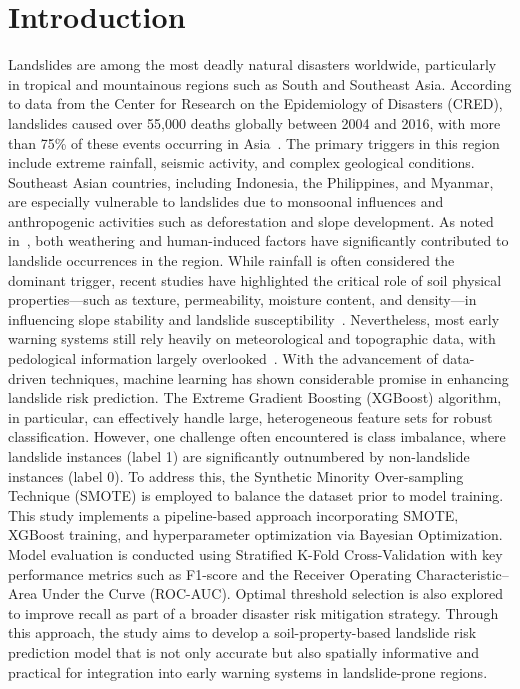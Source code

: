 \section{Introduction}

Landslides are among the most deadly natural disasters worldwide, particularly in tropical and mountainous regions such as South and Southeast Asia. According to data from the Center for Research on the Epidemiology of Disasters (CRED), landslides caused over 55,000 deaths globally between 2004 and 2016, with more than 75\% of these events occurring in Asia~\cite{intro01}. The primary triggers in this region include extreme rainfall, seismic activity, and complex geological conditions.
Southeast Asian countries, including Indonesia, the Philippines, and Myanmar, are especially vulnerable to landslides due to monsoonal influences and anthropogenic activities such as deforestation and slope development. As noted in~\cite{intro02}, both weathering and human-induced factors have significantly contributed to landslide occurrences in the region.
While rainfall is often considered the dominant trigger, recent studies have highlighted the critical role of soil physical properties—such as texture, permeability, moisture content, and density—in influencing slope stability and landslide susceptibility~\cite{intro03}. Nevertheless, most early warning systems still rely heavily on meteorological and topographic data, with pedological information largely overlooked~\cite{intro04}.
With the advancement of data-driven techniques, machine learning has shown considerable promise in enhancing landslide risk prediction. The Extreme Gradient Boosting (XGBoost) algorithm, in particular, can effectively handle large, heterogeneous feature sets for robust classification. However, one challenge often encountered is class imbalance, where landslide instances (label 1) are significantly outnumbered by non-landslide instances (label 0). To address this, the Synthetic Minority Over-sampling Technique (SMOTE) is employed to balance the dataset prior to model training.
This study implements a pipeline-based approach incorporating SMOTE, XGBoost training, and hyperparameter optimization via Bayesian Optimization. Model evaluation is conducted using Stratified K-Fold Cross-Validation with key performance metrics such as F1-score and the Receiver Operating Characteristic–Area Under the Curve (ROC-AUC). Optimal threshold selection is also explored to improve recall as part of a broader disaster risk mitigation strategy.
Through this approach, the study aims to develop a soil-property-based landslide risk prediction model that is not only accurate but also spatially informative and practical for integration into early warning systems in landslide-prone regions.
